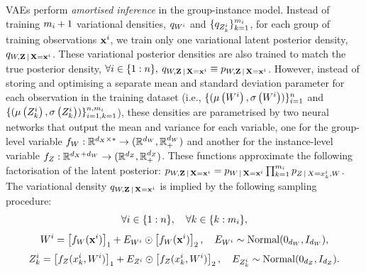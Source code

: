\documentclass[../thesis.tex]{subfiles}
\begin{document}
VAEs perform \textit{amortised inference} in the group-instance model. Instead of training $m_i+1$ variational densities, $\myfunc{q}_{\myrv{w}^i}$ and $\{\myfunc{q}_{\myrv{z}^i_k}\}_{k=1}^{\mycnt{m}_i}$, for each group of training observations $\mathbf{{x}}^i$, we train only one variational latent posterior density, $\myfunc{q}_{\myrv{w}, \mygroup{\myrv{z}} \,|\, \mygroup{\myrv{x}} = \mygroup{\myvect{x}}^i}$. These variational posterior densities are also trained to match the true posterior density, $\forall i \in \{1:n\},$ $\myfunc{q}_{\myrv{w}, \mygroup{\myrv{z}} \,|\, \mygroup{\myrv{x}} = \mygroup{\myvect{x}}^i} \equiv \myfunc{p}_{\myrv{w}, \mygroup{\myrv{z}} \,|\, \mygroup{\myrv{x}} = \mygroup{\myvect{x}}^i}$. However, instead of storing and optimising a separate mean and standard deviation parameter for each observation in the training dataset (i.e., $\{(\myvect{\mu} \left( \myrv{w}^i \right), \myvect{\sigma} \left( \myrv{w}^i \right))\}_{i=1}^\mycnt{n}$ and $\{(\myvect{\mu} \left( \myrv{z}^i_k \right), \myvect{\sigma} \left( \myrv{z}^i_k \right))\}_{i=1, k=1}^{\mycnt{n}, \mycnt{m}_i}$), these densities are parametrised by two neural networks that output the mean and variance for each variable, one for the group-level variable $\myfunc{f}_{\myrv{w}}: \mathbb{R}^{\mydim{x} \times *} \to (\mathbb{R}^{\mydim{w}}, \mathbb{R}^{\mydim{w}}_{+})$ and another for the instance-level variable $\myfunc{f}_{\myrv{z}}: \mathbb{R}^{\mydim{x} + \mydim{w}} \to (\mathbb{R}^{\mydim{z}}, \mathbb{R}^{\mydim{z}}_{+})$. These functions approximate the following factorisation of the latent posterior: $\myfunc{p}_{\myrv{w}, \mygroup{\myrv{z}} \,|\, \mygroup{\myrv{x}} = \mygroup{\myvect{x}}^i} = \myfunc{p}_{\myrv{w} \,|\, \mygroup{\myrv{x}} = \mygroup{\myvect{x}}^i} \prod_{k=1}^{\mycnt{m}_i} \myfunc{p}_{\myrv{z} \,|\, \myrv{x} = \myvect{x}^i_k, \myrv{w}}$. The variational density $\myfunc{q}_{\myrv{w}, \mygroup{\myrv{z}} \,|\, \mygroup{\myrv{x}} = \mygroup{\myvect{x}}^i}$ is implied by the following sampling procedure:
\[  
    \forall i \in \{1:n\}, \quad \forall k \in \{k:m_i\},
\]
\[
    \myrv{w}^i = \left[ \myfunc{f}_{\myrv{w}} (\mygroup{\myvect{x}}^i) \right]_1 + \myrv{e}_{\myrv{w}^i} \odot \left[ \myfunc{f}_{\myrv{w}} (\mygroup{\myvect{x}}^i) \right]_2, \quad \myrv{e}_{\myrv{w}^i} \sim \mathrm{Normal}(\myvect{0}_{\mydim{w}}, \myvect{I}_\mydim{w}),
\]
\[
    \myrv{z}^i_k = \left[ \myfunc{f}_{\myrv{z}} (\myvect{x}^i_k, \myrv{w}^i) \right]_1 + \myrv{e}_{\myrv{z}^i} \odot \left[ \myfunc{f}_{\myrv{z}} (\myvect{x}^i_k, \myrv{w}^i) \right]_2, \quad \myrv{e}_{\myrv{z}^i_k} \sim \mathrm{Normal}(\myvect{0}_{\mydim{z}}, \myvect{I}_\mydim{z}).
\]
\end{document}
